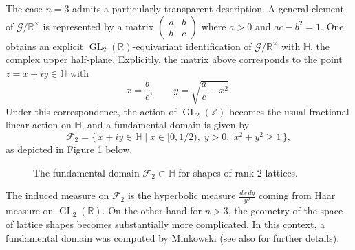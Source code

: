 \documentclass[table]{amsart}
\newcommand{\op}[1]{\operatorname{#1}}
\numberwithin{equation}{section}
\begin{document}
The case $n=3$ admits a particularly transparent description. A general element of $\mathcal{G}/\mathbb{R}^\times$ is represented by a matrix $\begin{pmatrix} a & b \\ b & c \end{pmatrix}$ where $a>0$ and $ac-b^2=1$. One obtains an explicit $\op{GL}_2(\mathbb{R})$-equivariant identification of $\mathcal{G}/\mathbb{R}^\times$ with $\mathbb{H}$, the complex upper half-plane. Explicitly, the matrix above corresponds to the point $z=x+iy\in\mathbb{H}$ with
\[
x=\frac{b}{c}, \qquad y=\sqrt{\frac{a}{c}-x^2}.
\]
Under this correspondence, the action of $\op{GL}_2(\mathbb{Z})$ becomes the usual fractional linear action on $\mathbb{H}$, and a fundamental domain is given by
\[
\mathcal{F}_2=\{\, x+iy\in\mathbb{H} \mid x\in[0,1/2),\; y>0,\; x^2+y^2\ge 1 \,\},
\]
as depicted in Figure 1 below.
\begin{figure}[h]
\centering
{}
\caption{The fundamental domain $\mathcal{F}_2 \subset \mathbb{H}$ for shapes of rank-$2$ lattices.}
\end{figure}The induced measure on $\mathcal{F}_2$ is the hyperbolic measure $\frac{dx\, dy}{y^2}$ coming from Haar measure on $\op{GL}_2(\mathbb{R})$.
On the other hand for $n>3$, the geometry of the space of lattice shapes becomes substantially more
complicated. In this context, a fundamental domain was computed by Minkowski \cite{Minkowski} (see also \cite{Grenier} for further details).
\end{document}

